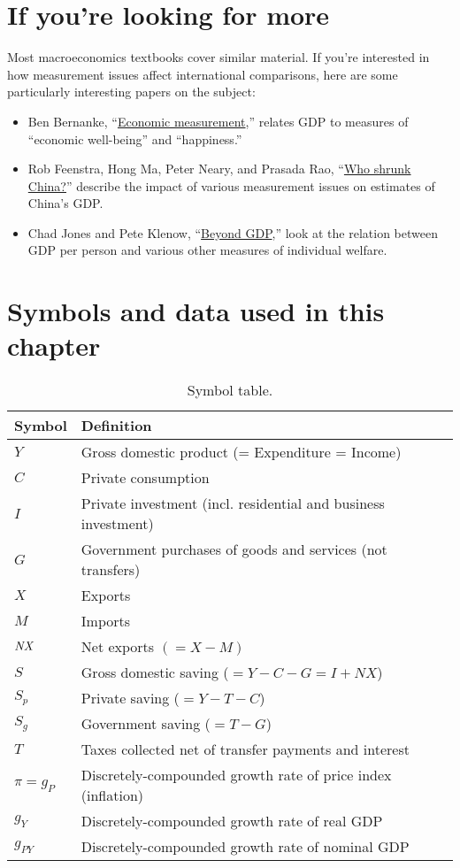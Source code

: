 \section*{If you're looking for more}

Most macroeconomics textbooks cover similar material.
If you're interested in how measurement issues affect
international comparisons, here are some
particularly interesting papers on the subject:
%
\begin{itemize}
\item Ben Bernanke,
``\href{http://www.federalreserve.gov/newsevents/speech/Bernanke20120806a.htm}{Economic measurement},''
    relates GDP to measures of ``economic well-being'' and ``happiness.''

\item Rob Feenstra, Hong Ma, Peter Neary, and Prasada Rao,
``\href{http://papers.nber.org/papers/w17729}{Who shrunk China?}''
describe the impact of various measurement issues on
estimates of China's GDP.

\item Chad Jones and Pete Klenow,
``\href{http://klenow.com/Jones_Klenow.pdf}{Beyond GDP},''
look at the relation between GDP per person and
various other measures of individual welfare.
\end{itemize}


\section*{Symbols and data used in this chapter}

\begin{table}[H]
\centering
\caption{Symbol table.}
\begin{tabular*}{0.99\textwidth}{l@{\extracolsep{\fill}}l}
\toprule
Symbol &  Definition\\
\midrule
$Y$        &Gross domestic product (= Expenditure = Income)\\
$C$        &Private consumption\\
$I$        &Private investment (incl. residential and business investment)\\
$G$        &Government purchases of goods and services (not transfers)\\
$X$        &Exports\\
$M$        &Imports\\
$\mbox{\em NX\/}$    &Net exports $(=X-M)$\\
$S$        &Gross domestic saving ($=Y-C-G=I+NX$)\\
$S_p$    &Private saving ($=Y-T-C$)\\
$S_g$    &Government saving ($=T-G$)\\
$T$        &Taxes collected net of transfer payments and interest\\
$ \pi = g_{P}$    &Discretely-compounded growth rate of price index (inflation)\\
$ g_{Y}$    &Discretely-compounded growth rate of real GDP\\
$ g_{PY}$    &Discretely-compounded growth rate of nominal GDP\\
\bottomrule
\end{tabular*}
\end{table}


